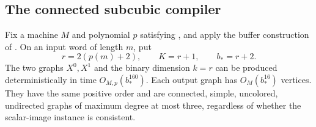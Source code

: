 \subsection{The connected subcubic compiler}

\begin{proposition}
\label{prop:uniform-construction}
Fix a machine \(M\) and polynomial \(p\) satisfying
, and apply the buffer construction
of .  On an input
word of length $m$, put
\[
 r=2(p(m)+2),\qquad K=r+1,\qquad b_*=r+2.
\]
The two graphs $X^0,X^1$ and the binary dimension $k=r$ can be produced
deterministically in time $O_{M,p}(b_*^{160})$.  Each output graph has
$O_M(b_*^{16})$ vertices.  They have the same positive order and are
connected, simple, uncolored, undirected graphs of maximum degree at most
three, regardless of whether the scalar-image instance is consistent.
\end{proposition}

